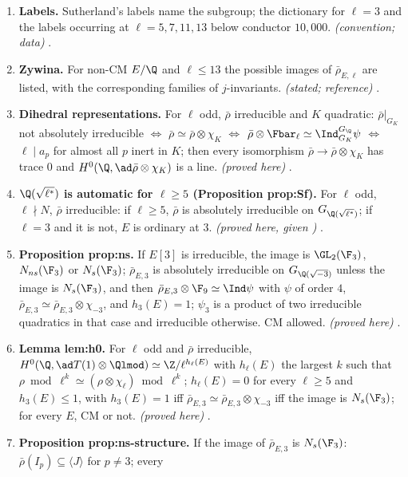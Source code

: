 \begin{enumerate}[label=\textbf{\thechapter.\arabic*}]
.
\item \textbf{Labels.} Sutherland's labels name the subgroup; the dictionary for $\ell=3$ and the labels occurring at $\ell=5,7,11,13$
below conductor $10{,}000$. \emph{(convention; data)} .
\item \textbf{Zywina.} For non-CM $E/\Q$ and $\ell\le13$ the possible images of $\bar\rho_{E,\ell}$ are listed, with the corresponding families of
$j$-invariants. \emph{(stated; reference)} .
\item \textbf{Dihedral representations.} For $\ell$ odd, $\bar\rho$ irreducible and $K$ quadratic: $\bar\rho|_{G_K}$ not absolutely irreducible $\iff$
$\bar\rho\simeq\bar\rho\otimes\chi_K$ $\iff$ $\bar\rho\otimes\Fbar_\ell\simeq\Ind_{G_K}^{G_\Q}\psi$ $\iff$ $\ell\mid a_p$ for almost all $p$ inert in $K$; then every
isomorphism $\bar\rho\to\bar\rho\otimes\chi_K$ has trace $0$ and $H^0(\Q,\ad\bar\rho\otimes\chi_K)$ is a line. \emph{(proved here)}
.
\item \textbf{$\Q(\sqrt{\ell^*})$ is automatic for $\ell\ge5$ (Proposition prop:Sf).} For $\ell$ odd, $\ell\nmid N$, $\bar\rho$ irreducible: if $\ell\ge5$,
$\bar\rho$ is absolutely irreducible on $G_{\Q(\sqrt{\ell^*})}$; if $\ell=3$ and it is not, $E$ is ordinary at $3$. \emph{(proved here, given
)}
.
\item \textbf{Proposition prop:ns.} If $E[3]$ is irreducible, the image is $\GL_2(\F_3)$, $N_{ns}(\F_3)$ or $N_s(\F_3)$; $\bar\rho_{E,3}$ is absolutely
irreducible on $G_{\Q(\sqrt{-3})}$ unless the image is $N_s(\F_3)$, and then $\bar\rho_{E,3}\otimes\F_9\simeq\Ind\psi$ with $\psi$ of order $4$,
$\bar\rho_{E,3}\simeq\bar\rho_{E,3}\otimes\chi_{-3}$, and $h_3(E)=1$; $\psi_3$ is a product of two irreducible quadratics in that case and irreducible
otherwise. CM allowed. \emph{(proved here)} .
\item \textbf{Lemma lem:h0.} For $\ell$ odd and $\bar\rho$ irreducible, $H^0(\Q,\ad T(1)\otimes\Qlmod)\simeq\Z/\ell^{h_\ell(E)}$ with $h_\ell(E)$ the largest $k$
such that $\rho\bmod\ell^k\simeq(\rho\otimes\chi_\ell)\bmod\ell^k$; $h_\ell(E)=0$ for every $\ell\ge5$ and $h_3(E)\le1$, with $h_3(E)=1$ iff
$\bar\rho_{E,3}\simeq\bar\rho_{E,3}\otimes\chi_{-3}$ iff the image is $N_s(\F_3)$; for every $E$, CM or not. \emph{(proved here)}
.
\item \textbf{Proposition prop:ns-structure.} If the image of $\bar\rho_{E,3}$ is $N_s(\F_3)$: $\bar\rho(I_p)\subseteq\langle J\rangle$ for $p\ne3$; every

\end{enumerate}
